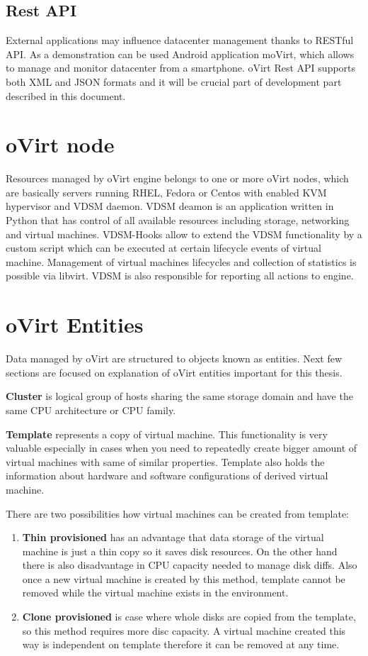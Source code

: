 \subsection{Rest API}
External applications may influence datacenter management thanks to RESTful API. As a demonstration can be used Android application moVirt, which allows to manage and monitor datacenter from a smartphone. oVirt Rest API supports both XML and JSON formats and it will be crucial part of development part described in this document.

\section{oVirt node}
Resources managed by oVirt engine belongs to one or more oVirt nodes, which are basically servers running RHEL, Fedora or Centos with enabled KVM\cite{kvm} hypervisor and VDSM daemon. VDSM deamon is an application written in Python that has control of all available resources including storage, networking and virtual machines. VDSM-Hooks\cite{hooks} allow to extend the VDSM functionality by a custom script which can be executed at certain lifecycle events of virtual machine. Management of virtual machines lifecycles and collection of statistics is possible via libvirt\cite{libvirt}. VDSM is also responsible for reporting all actions to engine.

\section{oVirt Entities}
Data managed by oVirt are structured to objects known as entities. Next few sections are focused on explanation of oVirt entities important for this thesis.

\textbf{Cluster} is logical group of hosts sharing the same storage domain and have the same CPU architecture or CPU family.

\textbf{Template} represents a copy of virtual machine. This functionality is very valuable especially in cases when you need to repeatedly create bigger amount of virtual machines with same of similar properties. Template also holds the information about hardware and software configurations of derived virtual machine. 

\noindent There are two possibilities how virtual machines can be created from template: 
\begin{enumerate}

\item \textbf{Thin provisioned} has an advantage that data storage of the virtual machine is just a thin copy so it saves disk resources. On the other hand there is also disadvantage in CPU capacity needed to manage disk diffs. Also once a new virtual machine is created by this method, template cannot be removed while the virtual machine exists in the environment. 

\item \textbf{Clone provisioned} is case where whole disks are copied from the template, so this method requires more disc capacity. A virtual machine created this way is independent on template therefore it can be removed at any time. 
\end{enumerate} 

